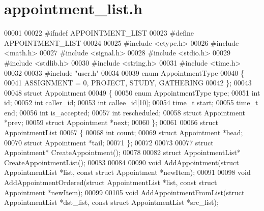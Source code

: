 \section{appointment\+\_\+list.\+h}
\label{appointment__list_8h_source}

\begin{DoxyCode}
00001 
00022 \textcolor{preprocessor}{#ifndef APPOINTMENT\_LIST}
00023 \textcolor{preprocessor}{#define APPOINTMENT\_LIST}
00024 
00025 \textcolor{preprocessor}{#include <ctype.h>}
00026 \textcolor{preprocessor}{#include <math.h>}
00027 \textcolor{preprocessor}{#include <signal.h>}
00028 \textcolor{preprocessor}{#include <stdio.h>}
00029 \textcolor{preprocessor}{#include <stdlib.h>}
00030 \textcolor{preprocessor}{#include <string.h>}
00031 \textcolor{preprocessor}{#include <time.h>}
00032 
00033 \textcolor{preprocessor}{#include "user.h"}
00034 
00039 \textcolor{keyword}{enum} AppointmentType
00040 \{
00041     ASSIGNMENT = 0, PROJECT, STUDY, GATHERING
00042 \};
00043 
00048 \textcolor{keyword}{struct }Appointment
00049 \{
00050     \textcolor{keyword}{enum} AppointmentType type;
00051     \textcolor{keywordtype}{int} id;
00052     \textcolor{keywordtype}{int} caller_id;
00053     \textcolor{keywordtype}{int} callee_id[10];
00054     time\_t start;
00055     time\_t end;
00056     \textcolor{keywordtype}{int} is_accepted;
00057     \textcolor{keywordtype}{int} rescheduled;
00058     \textcolor{keyword}{struct }Appointment *prev;
00059     \textcolor{keyword}{struct }Appointment *next;
00060 \};
00061 
00066 \textcolor{keyword}{struct }AppointmentList
00067 \{
00068     \textcolor{keywordtype}{int} count;
00069     \textcolor{keyword}{struct }Appointment *head;
00070     \textcolor{keyword}{struct }Appointment *tail;
00071 \};
00072 
00073 
00077 \textcolor{keyword}{struct }Appointment* CreateAppointment();
00078 
00082 \textcolor{keyword}{struct }AppointmentList* CreateAppointmentList();
00083 
00084 
00090 \textcolor{keywordtype}{void} AddAppointment(\textcolor{keyword}{struct} AppointmentList *list, \textcolor{keyword}{const} \textcolor{keyword}{struct} Appointment *newItem);
00091 
00098 \textcolor{keywordtype}{void} AddAppointmentOrdered(\textcolor{keyword}{struct} AppointmentList *list, \textcolor{keyword}{const} \textcolor{keyword}{struct} 
      Appointment *newItem);
00099 
00105 \textcolor{keywordtype}{void} AddAppointmentFromList(\textcolor{keyword}{struct} AppointmentList *dst\_list, \textcolor{keyword}{const} \textcolor{keyword}{struct} 
      AppointmentList *src\_list);

\end{DoxyCode}
